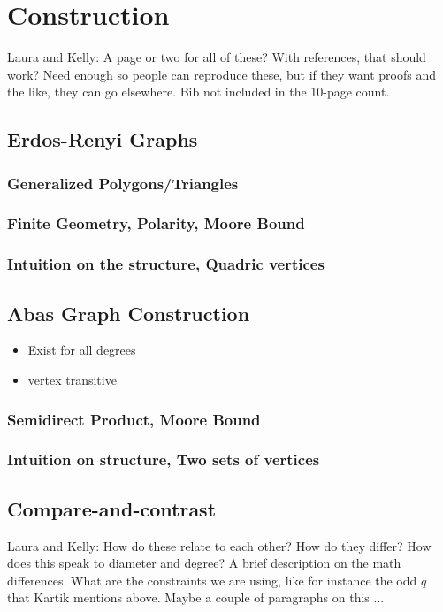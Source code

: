 \section{Construction}
{\color{red}Laura and Kelly: A page or two for all of these? With references, that should work? Need enough so people can reproduce these, but if they want proofs and the like, they can go elsewhere. Bib not included in the 10-page count.}


\subsection{Erdos-Renyi Graphs}

\subsubsection{Generalized Polygons/Triangles}

\subsubsection{Finite Geometry, Polarity, Moore Bound}

\subsubsection{Intuition on the structure, Quadric vertices}


\subsection{Abas Graph Construction}
\begin{itemize}
    \item Exist for all degrees
    \item vertex transitive
\end{itemize}

\subsubsection{Semidirect Product, Moore Bound}

\subsubsection{Intuition on structure, Two sets of vertices}

{\color{red}
	\subsection{Compare-and-contrast}
	Laura and Kelly: How do these relate to each other? How do they differ? How does this speak to diameter and degree? A brief description on the math differences. What are the constraints we are using, like for instance the odd $q$ that Kartik mentions above. Maybe a couple of paragraphs on this ...
}

